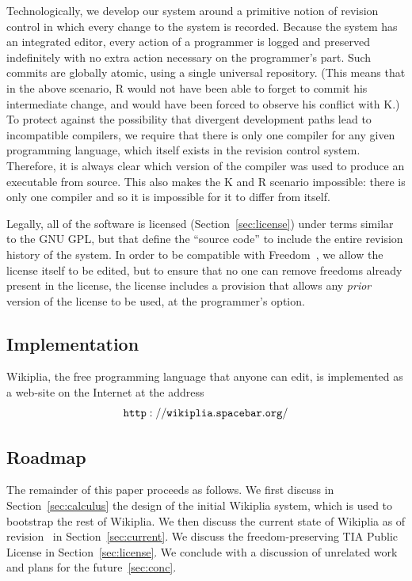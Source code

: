 \documentclass[twocolumn]{article}
\begin{document}
Technologically, we develop our system around a primitive notion of
revision control in which every change to the system is recorded.
Because the system has an integrated editor, every action of a
programmer is logged and preserved indefinitely with no extra action
necessary on the programmer's part. Such commits are globally atomic,
using a single universal repository. (This means that in the above
scenario, R would not have been able to forget to commit his
intermediate change, and would have been forced to observe his
conflict with K.) To protect against the possibility that divergent
development paths lead to incompatible compilers, we require that
there is only one compiler for any given programming language, which
itself exists in the revision control system. Therefore, it is always
clear which version of the compiler was used to produce an executable
from source. This also makes the K and R scenario impossible: there is
only one compiler and so it is impossible for it to differ from
itself.

Legally, all of the software is licensed (Section~\ref{sec:license})
under terms similar to the GNU GPL, but that define the ``source
code'' to include the entire revision history of the system. In order
to be compatible with Freedom~\ffree, we allow the license itself to be
edited, but to ensure that no one can remove freedoms already present
in the license, the license includes a provision that allows any {\em
prior} version of the license to be used, at the programmer's option.

\subsection{Implementation}

Wikiplia, the free programming language that anyone can edit, is
implemented as a web-site on the Internet at the address
$${\tt http://wikiplia.spacebar.org/}$$

\subsection{Roadmap}

The remainder of this paper proceeds as follows. We first discuss in
Section~\ref{sec:calculus} the design of the initial Wikiplia system,
which is used to bootstrap the rest of Wikiplia. We then discuss the
current state of Wikiplia as of revision \currentrevision\ in
Section~\ref{sec:current}. We discuss the freedom-preserving TIA
Public License in Section~\ref{sec:license}. We conclude with a
discussion of unrelated work and plans for the future~\ref{sec:conc}.
\end{document}
